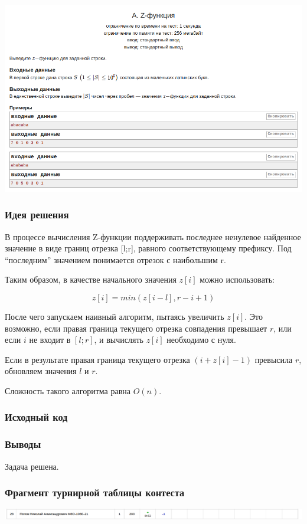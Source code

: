 \begin{center}
\includegraphics[width=\textwidth]{statements/Contest9A.png}
\end{center}

\subsubsection*{Идея решения}

В процессе вычисления Z-функции поддерживать последнее ненулевое найденное значение в виде границ отрезка [l;r], равного соответствующему префиксу. Под “последним” значением понимается отрезок с наибольшим r.

Таким образом, в качестве начального значения $z[i]$ можно использовать:

$$z[i] = min(z[i - l], r - i + 1)$$

После чего запускаем наивный алгоритм, пытаясь увеличить $z[i]$. Это возможно, если правая граница текущего отрезка совпадения превышает $r$, или если $i$ не входит в $[l; r]$, и вычислять $z[i]$ необходимо с нуля.

Если в результате правая граница текущего отрезка 
$(i + z[i]-1)$ превысила $r$, обновляем значения $l$ и $r$.

Сложность такого алгоритма равна $O(n)$.

\subsubsection*{Исходный код}


\subsubsection*{Выводы}
Задача решена.
\newline

\subsubsection*{Фрагмент турнирной таблицы контеста}
\begin{center}
\includegraphics[width=\textwidth]{standings/Contest9.png}\newline\noindent
\end{center}





\vspace{16pt}
\pagebreak
